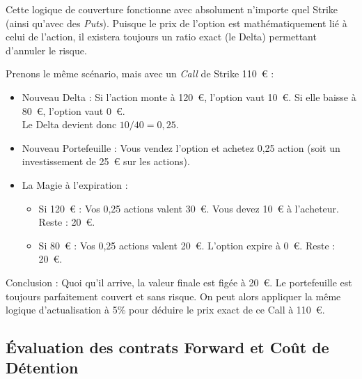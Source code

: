 \newpage

\begin{remarquebox}
Cette logique de couverture fonctionne avec absolument n'importe quel Strike (ainsi qu'avec des \textit{Puts}). Puisque le prix de l'option est mathématiquement lié à celui de l'action, il existera toujours un ratio exact (le Delta) permettant d'annuler le risque.

Prenons le même scénario, mais avec un \textit{Call} de Strike 110~€ :
\begin{itemize}[label=$\rightarrow$]
    \item Nouveau Delta : Si l'action monte à 120~€, l'option vaut 10~€. Si elle baisse à 80~€, l'option vaut 0~€. \\
    Le Delta devient donc $10 / 40 = 0,25$.
    \item Nouveau Portefeuille : Vous vendez l'option et achetez 0,25 action (soit un investissement de 25~€ sur les actions).
    \item La Magie à l'expiration : 
    \begin{itemize}[label=$\cdot$]
        \item Si 120~€ : Vos 0,25 actions valent 30~€. Vous devez 10~€ à l'acheteur. Reste : 20~€.
        \item Si 80~€ : Vos 0,25 actions valent 20~€. L'option expire à 0~€. Reste : 20~€.
    \end{itemize}
\end{itemize}
Conclusion : Quoi qu'il arrive, la valeur finale est figée à 20~€. Le portefeuille est toujours parfaitement couvert et sans risque. On peut alors appliquer la même logique d'actualisation à 5\% pour déduire le prix exact de ce Call à 110~€.
\end{remarquebox}

\subsection{Évaluation des contrats Forward et Coût de Détention}


